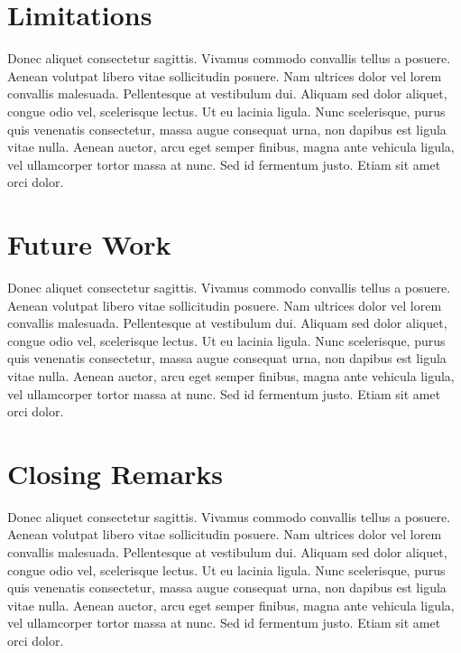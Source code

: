 \section{Limitations}
\label{sec:limitations_conclusion}
Donec aliquet consectetur sagittis. Vivamus commodo convallis tellus a posuere. Aenean volutpat libero vitae sollicitudin posuere. Nam ultrices dolor vel lorem convallis malesuada. Pellentesque at vestibulum dui. Aliquam sed dolor aliquet, congue odio vel, scelerisque lectus. Ut eu lacinia ligula. Nunc scelerisque, purus quis venenatis consectetur, massa augue consequat urna, non dapibus est ligula vitae nulla. Aenean auctor, arcu eget semper finibus, magna ante vehicula ligula, vel ullamcorper tortor massa at nunc. Sed id fermentum justo. Etiam sit amet orci dolor.

\section{Future Work}
\label{sec:future_work}
Donec aliquet consectetur sagittis. Vivamus commodo convallis tellus a posuere. Aenean volutpat libero vitae sollicitudin posuere. Nam ultrices dolor vel lorem convallis malesuada. Pellentesque at vestibulum dui. Aliquam sed dolor aliquet, congue odio vel, scelerisque lectus. Ut eu lacinia ligula. Nunc scelerisque, purus quis venenatis consectetur, massa augue consequat urna, non dapibus est ligula vitae nulla. Aenean auctor, arcu eget semper finibus, magna ante vehicula ligula, vel ullamcorper tortor massa at nunc. Sed id fermentum justo. Etiam sit amet orci dolor.


\section{Closing Remarks}
\label{sec:closing}
Donec aliquet consectetur sagittis. Vivamus commodo convallis tellus a posuere. Aenean volutpat libero vitae sollicitudin posuere. Nam ultrices dolor vel lorem convallis malesuada. Pellentesque at vestibulum dui. Aliquam sed dolor aliquet, congue odio vel, scelerisque lectus. Ut eu lacinia ligula. Nunc scelerisque, purus quis venenatis consectetur, massa augue consequat urna, non dapibus est ligula vitae nulla. Aenean auctor, arcu eget semper finibus, magna ante vehicula ligula, vel ullamcorper tortor massa at nunc. Sed id fermentum justo. Etiam sit amet orci dolor.


\let\cleardoublepage\clearpage
